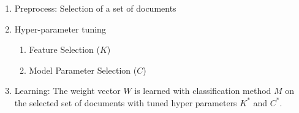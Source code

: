 \begin{enumerate}
\item Preprocess: Selection of a set of documents
\item Hyper-parameter tuning
\begin{enumerate}
\item Feature Selection ($K$)
\item Model Parameter Selection ($C$)
\end{enumerate}
\item Learning: The weight vector $W$ is learned with classification method $M$ on the selected set of documents with tuned hyper parameters $K^{*}$ and $C^{*}$. 
\end{enumerate}

